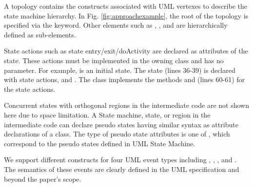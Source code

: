 \noindent
{}
A topology contains the constructs associated with UML vertexes to describe the state machine hierarchy.
In Fig. \ref{fig:approachexample}, the root of the topology is specified via the  keyword.
Other elements such as , , and  are hierarchically defined as sub-elements.

State actions such as state entry/exit/doActivity are declared as attributes of the state.
These actions must be implemented in the owning class and has no parameter.
For example,  is an initial state. 
The  state (lines 36-39) is declared with state actions,  and . 
The  class implements the methods  and  (lines 60-61) for the state actions.


Concurrent states with orthogonal regions in the intermediate code are not shown here due to space limitation. 
A State machine, state, or region in the intermediate code can declare pseudo states having similar syntax as attribute declarations of a class.
The type of pseudo state attributes is one of , which correspond to the pseudo states defined in UML State Machine. 

\noindent
{}
We support different constructs for four UML event types including , , , and .
The semantics of these events are clearly defined in the UML specification and beyond the paper's scope.

